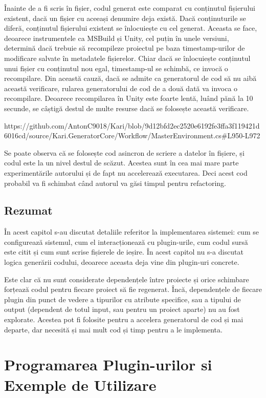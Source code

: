 \documentclass[a4paper,12pt]{report}
\begin{document}
Înainte de a fi scris în fișier, codul generat este comparat cu conținutul fișierului existent, dacă un fișier cu aceeași denumire deja există.
Dacă conținuturile se diferă, conținutul fișierului existent se înlocuiește cu cel generat.
Aceasta se face, deoarece instrumentele ca MSBuild și Unity, cel puțin în unele versiuni, determină dacă trebuie să recompileze proiectul pe baza timestamp-urilor de modificare salvate în metadatele fișierelor.
Chiar dacă se înlocuiește conținutul unui fișier cu conținutul nou egal, timestamp-ul se schimbă, ce invocă o recompilare.
Din această cauză, dacă se admite ca generatorul de cod să nu aibă această verificare, rularea generatorului de cod de a două dată va invoca o recompilare.
Deoarece recompilarea în Unity este foarte lentă, luând pănă la 10 secunde, se câștigă destul de multe resurse dacă se folosește această verificare.

https://github.com/AntonC9018/Kari/blob/9d12bfd2ec2520e6192fe3ffa3f119421d6016cd/source/Kari.GeneratorCore/Workflow/MasterEnvironment.cs#L950-L972

Se poate observa că se folosește cod asincron de scriere a datelor în fișiere, și codul este la un nivel destul de scăzut.
Acestea sunt în cea mai mare parte experimentările autorului și de fapt nu accelerează executarea.
Deci acest cod probabil va fi schimbat când autorul va găsi timpul pentru refactoring.

\section{Rezumat}

În acest capitol s-au discutat detaliile referitor la implementarea sistemei: cum se configurează sistemul, cum el interacționează cu plugin-urile, cum codul sursă este citit și cum sunt scrise fișierele de ieșire.
În acest capitol nu s-a discutat logica generării codului, deoarece aceasta deja vine din plugin-uri concrete.

Este clar că nu sunt considerate dependențele între proiecte și orice schimbare forțează codul pentru fiecare proiect să fie regenerat.
Încă, dependențele de fiecare plugin din punct de vedere a tipurilor cu atribute specifice, sau a tipului de output (dependent de totul input, sau pentru un proiect aparte) nu au fost explorate.
Acestea pot fi folosite pentru a accelera generatorul de cod și mai departe, dar necesită și mai mult cod și timp pentru a le implementa.

\chapter{Programarea Plugin-urilor si Exemple de Utilizare}
\end{document}
